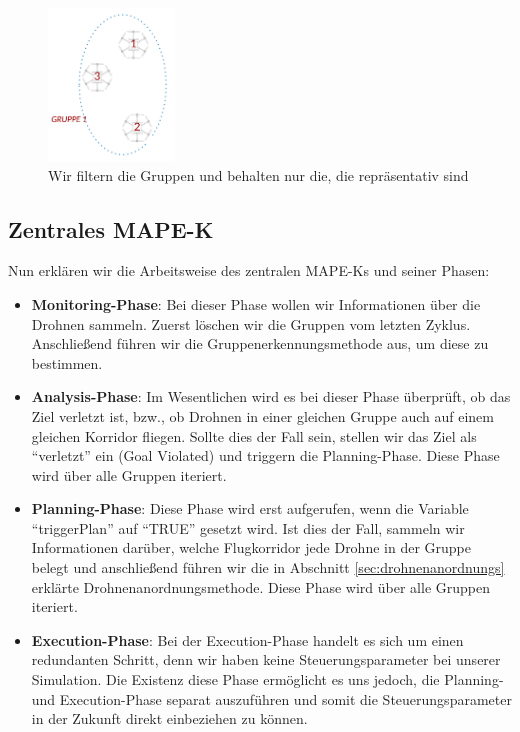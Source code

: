 \documentclass[a4paper,titlepage,onecolumn,twoside,12pt]{article}
\begin{document}
\begin{figure}
\centering
\includegraphics[width = 0.3\textwidth]{gruppenerkennung4}
\caption{Wir filtern die Gruppen und behalten nur die, die repräsentativ sind}
\label{fig:gruppenerkennung4}
\end{figure}

\subsection{Zentrales MAPE-K}
\label{subsec:zentralesmapek}

Nun erklären wir die Arbeitsweise des zentralen MAPE-Ks und seiner Phasen:

\begin{itemize}
\item \textbf{Monitoring-Phase}: Bei dieser Phase wollen wir Informationen über die Drohnen sammeln. Zuerst löschen wir die Gruppen vom letzten Zyklus. Anschließend führen wir die Gruppenerkennungsmethode aus, um diese zu bestimmen.
\item \textbf{Analysis-Phase}: Im Wesentlichen wird es bei dieser Phase überprüft, ob das Ziel verletzt ist, bzw., ob Drohnen in einer gleichen Gruppe auch  auf einem gleichen Korridor fliegen. Sollte dies der Fall sein, stellen wir das Ziel als "`verletzt"' ein (Goal Violated) und triggern die Planning-Phase. Diese Phase wird über alle Gruppen iteriert.
\item \textbf{Planning-Phase}: Diese Phase wird erst aufgerufen, wenn die Variable "`triggerPlan"' auf "`TRUE"' gesetzt wird. Ist dies der Fall, sammeln wir Informationen darüber, welche Flugkorridor jede Drohne in der Gruppe belegt und anschließend führen wir die in Abschnitt \ref{sec:drohnenanordnungs} erklärte Drohnenanordnungsmethode. Diese Phase wird über alle Gruppen iteriert.
\item \textbf{Execution-Phase}: Bei der Execution-Phase handelt es sich um einen redundanten Schritt, denn wir haben keine Steuerungsparameter bei unserer Simulation. Die Existenz diese Phase ermöglicht es uns jedoch, die Planning- und Execution-Phase separat auszuführen und somit die Steuerungsparameter in der Zukunft direkt einbeziehen zu können.
\end{itemize}
\end{document}
